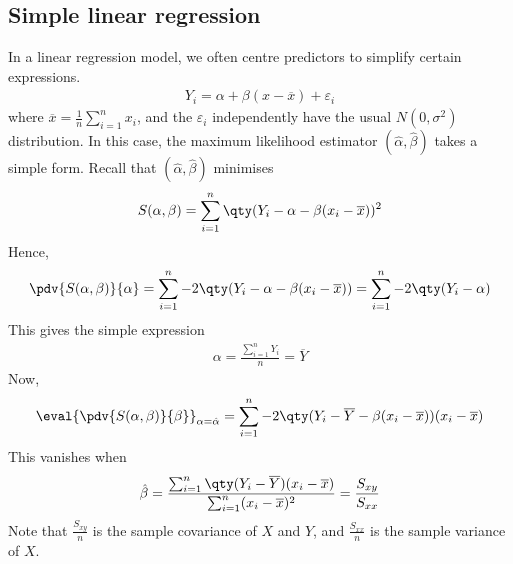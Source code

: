 \subsection{Simple linear regression}
In a linear regression model, we often centre predictors to simplify certain expressions.
\begin{align*}
	Y_i = \alpha + \beta (x - \overline x) + \varepsilon_i
\end{align*}
where $\overline x = \frac{1}{n} \sum_{i=1}^n x_i$, and the $\varepsilon_i$ independently have the usual $N(0, \sigma^2)$ distribution.
In this case, the maximum likelihood estimator $(\hat \alpha, \hat \beta)$ takes a simple form.
Recall that $(\hat \alpha, \hat \beta)$ minimises
\begin{align*}
	S(\alpha, \beta) = \sum_{i=1}^n \qty(Y_i - \alpha - \beta(x_i - \overline x))^2
\end{align*}
Hence,
\begin{align*}
	\pdv{S(\alpha, \beta)}{\alpha} = \sum_{i=1}^n -2\qty(Y_i - \alpha - \beta(x_i - \overline x)) = \sum_{i=1}^n -2\qty(Y_i - \alpha)
\end{align*}
This gives the simple expression
\begin{align*}
	\alpha = \frac{\sum_{i=1}^n Y_i}{n} = \overline Y
\end{align*}
Now,
\begin{align*}
	\eval{\pdv{S(\alpha, \beta)}{\beta}}_{\alpha = \hat \alpha} = \sum_{i=1}^n -2\qty(Y_i - \overline Y - \beta(x_i - \overline x))(x_i - \overline x)
\end{align*}
This vanishes when
\begin{align*}
	\hat \beta = \frac{\sum_{i=1}^n \qty(Y_i - \overline Y)(x_i - \overline x)}{\sum_{i=1}^n (x_i - \overline x)^2} = \frac{S_{xy}}{S_{xx}}
\end{align*}
Note that $\frac{S_{xy}}{n}$ is the sample covariance of $X$ and $Y$, and $\frac{S_{xx}}{n}$ is the sample variance of $X$.
